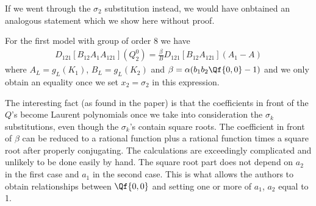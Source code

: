 If we went through the $\sigma_2$ substitution instead, we would have onbtained an analogous statement which we show here without proof.
\begin{theorem} For the first model with group of order 8 we have
\begin{align}
	D_{121}[B_{12}A_1A_{121}]\left(Q_2^0\right) = \frac{\beta}{B} D_{121}[B_{12}A_{121}](A_1-A)
\end{align}
where $A_L = g_L(K_1)$, $B_L = g_L(K_2)$ and $\beta = \alpha (b_1b_2\Qf{0,0}-1)$ and we only obtain an equality once we set $x_2 = \sigma_2$ in this expression.
\end{theorem}
The interesting fact (as found in the paper) is that the coefficients in front of the $Q$'s become Laurent polynomials once we take into consideration the $\sigma_k$ substitutions, even though the $\sigma_k$'s contain square roots. The coefficient in front of $\beta$ can be reduced to a rational function plus a rational function times a square root after properly conjugating. The calculations are exceedingly complicated and unlikely to be done easily by hand. The square root part does not depend on $a_2$ in the first case and $a_1$ in the second case. This is what allows the authors to obtain relationships between $\Qf{0,0}$ and setting one or more of $a_1$, $a_2$ equal to 1.



\endinput


